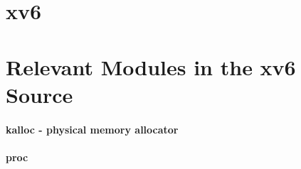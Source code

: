 \section{xv6}
\subsection*{}
\subsection*{}










\section{Relevant Modules in the xv6 Source}
\paragraph*{kalloc - physical memory allocator}
\paragraph*{proc}
